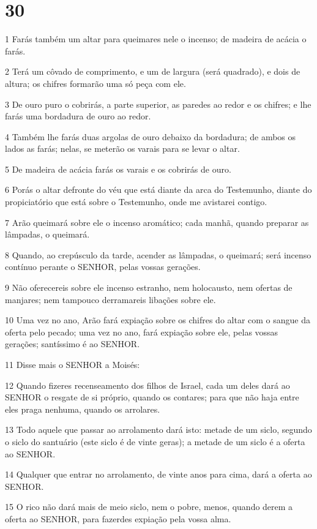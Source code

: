 \chapter{30}

\par 1 Farás também um altar para queimares nele o incenso; de madeira de acácia o farás.
\par 2 Terá um côvado de comprimento, e um de largura (será quadrado), e dois de altura; os chifres formarão uma só peça com ele.
\par 3 De ouro puro o cobrirás, a parte superior, as paredes ao redor e os chifres; e lhe farás uma bordadura de ouro ao redor.
\par 4 Também lhe farás duas argolas de ouro debaixo da bordadura; de ambos os lados as farás; nelas, se meterão os varais para se levar o altar.
\par 5 De madeira de acácia farás os varais e os cobrirás de ouro.
\par 6 Porás o altar defronte do véu que está diante da arca do Testemunho, diante do propiciatório que está sobre o Testemunho, onde me avistarei contigo.
\par 7 Arão queimará sobre ele o incenso aromático; cada manhã, quando preparar as lâmpadas, o queimará.
\par 8 Quando, ao crepúsculo da tarde, acender as lâmpadas, o queimará; será incenso contínuo perante o SENHOR, pelas vossas gerações.
\par 9 Não oferecereis sobre ele incenso estranho, nem holocausto, nem ofertas de manjares; nem tampouco derramareis libações sobre ele.
\par 10 Uma vez no ano, Arão fará expiação sobre os chifres do altar com o sangue da oferta pelo pecado; uma vez no ano, fará expiação sobre ele, pelas vossas gerações; santíssimo é ao SENHOR.
\par 11 Disse mais o SENHOR a Moisés:
\par 12 Quando fizeres recenseamento dos filhos de Israel, cada um deles dará ao SENHOR o resgate de si próprio, quando os contares; para que não haja entre eles praga nenhuma, quando os arrolares.
\par 13 Todo aquele que passar ao arrolamento dará isto: metade de um siclo, segundo o siclo do santuário (este siclo é de vinte geras); a metade de um siclo é a oferta ao SENHOR.
\par 14 Qualquer que entrar no arrolamento, de vinte anos para cima, dará a oferta ao SENHOR.
\par 15 O rico não dará mais de meio siclo, nem o pobre, menos, quando derem a oferta ao SENHOR, para fazerdes expiação pela vossa alma.
